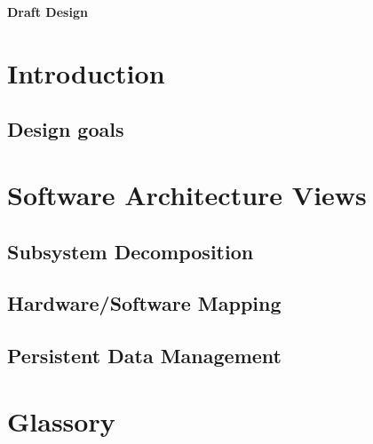 \documentclass{article}
\begin{document}
\begin{minipage}[H]{\textwidth}
\vspace{0.3cm}
		\begin{center}
		  \vspace{0.3cm}
		  \Huge{\textbf{Draft Design}}\\
	      \vspace{0.3cm}	
   		  \vspace{0.7cm}	
		\end{center}
	\end{minipage}
\tableofcontents
\newpage
	\section{Introduction}
	
	 \subsection{Design goals}
	 
	 \section{Software Architecture Views}
	 \subsection{Subsystem Decomposition} 
	 
	 \subsection{Hardware/Software Mapping} 
	 
	 \subsection{Persistent Data Management} 
	 

	\section{Glassory}


	
 
	\printglossaries


	
\end{document}
